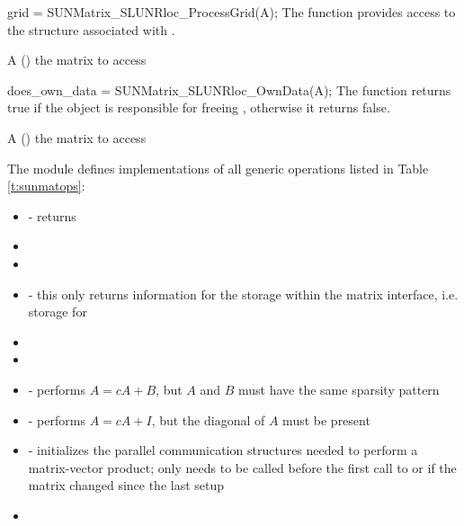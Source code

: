 {
  grid = SUNMatrix\_SLUNRloc\_ProcessGrid(A);
}
{
  The function  provides access
  to the {\superludist}  structure associated with .
}
{
  \begin{args}
  \item[A] () the matrix to access
  \end{args}
}
{
}
{
}

{
  does\_own\_data = SUNMatrix\_SLUNRloc\_OwnData(A);
}
{
  The function  returns true if the 
  object is responsible for freeing , otherwise it returns false.
}
{
  \begin{args}
  \item[A] () the matrix to access
  \end{args}
}
{
}
{
}

The {\sunmatslunrloc} module defines implementations of all generic  operations
listed in Table \ref{t:sunmatops}:

\begin{itemize}
  \item {} - returns 
  \item {}
  \item {}
  \item {} - this only returns information for the storage within the
    matrix interface, i.e. storage for 
  \item {}
  \item {}
  \item {} - performs $A = cA + B$, but $A$ and $B$ must have the same sparsity pattern 
  \item {} - performs $A = cA + I$, but the diagonal of $A$ must be present
  \item {} - initializes the {\superludist} parallel communication
    structures needed to perform a matrix-vector product; only needs to be called before the
    first call to  or if the matrix changed since the last setup
  \item {}
\end{itemize}

